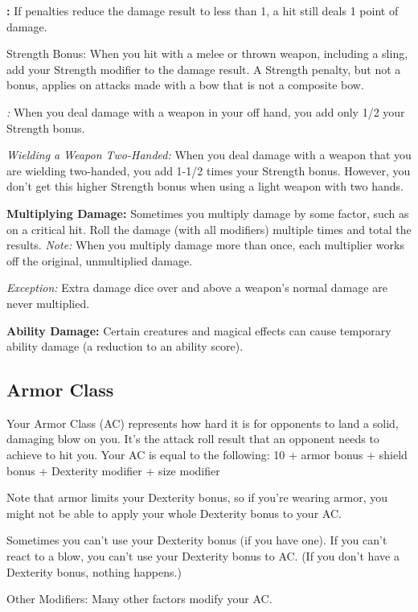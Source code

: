 \textbf{:} If penalties reduce the damage result to less than 1, 
a hit still deals 1 point of damage.

Strength Bonus: When you hit with a melee or thrown weapon, including a sling, 
add your Strength modifier to the damage result. A Strength penalty, but not a 
bonus, applies on attacks made with a bow that is not a composite bow.

\textit{:} When you deal damage with a weapon in your off hand, 
you add only 1/2 your Strength bonus.

\textit{Wielding a Weapon Two-Handed:} When you deal damage with a weapon that 
you are wielding two-handed, you add 1-1/2 times your Strength bonus. However, 
you don't get this higher Strength bonus when using a light weapon with two hands.

\textbf{Multiplying Damage:} Sometimes you multiply damage by some factor, such 
as on a critical hit. Roll the damage (with all modifiers) multiple times and total 
the results. \textit{Note:} When you multiply damage more than once, each multiplier 
works off the original, unmultiplied damage.

\textit{Exception:} Extra damage dice over and above a weapon's normal damage are 
never multiplied.

\textbf{Ability Damage:} Certain creatures and magical effects can cause temporary 
ability damage (a reduction to an ability score).

\subsection{Armor Class}

Your Armor Class (AC) represents how hard it is for opponents to land a solid, 
damaging blow on you. It's the attack roll result that an opponent needs to achieve 
to hit you. Your AC is equal to the following: 10 + armor bonus + shield bonus 
+ Dexterity modifier + size modifier

Note that armor limits your Dexterity bonus, so if you're wearing armor, you might 
not be able to apply your whole Dexterity bonus to your AC.

Sometimes you can't use your Dexterity bonus (if you have one). If you can't react 
to a blow, you can't use your Dexterity bonus to AC. (If you don't have a Dexterity 
bonus, nothing happens.)

Other Modifiers: Many other factors modify your AC.

